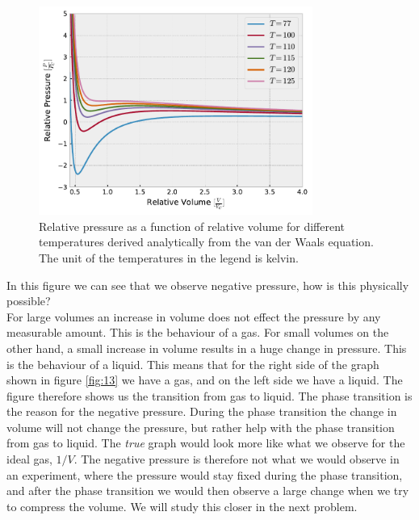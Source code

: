 \documentclass[a4paper,10pt, english]{article}
\begin{document}
\begin{figure}[h!]
  \centering
    \includegraphics[width=0.8\textwidth]{../figures/equation_of_state.pdf}
    \caption{Relative pressure as a function of relative volume for different temperatures derived analytically from the van der Waals equation. The unit of the temperatures in the legend is kelvin.}
    \label{fig:13}
\end{figure}
In this figure we can see that we observe negative pressure, how is this physically possible? \\For large volumes an increase in volume does not effect the pressure by any measurable amount. This is the behaviour of a gas. For small volumes on the other hand, a small increase in volume results in a huge change in pressure. This is the behaviour of a liquid. This means that for the right side of the graph shown in figure \vref{fig:13} we have a gas, and on the left side we have a liquid. The figure therefore shows us the transition from gas to liquid. The phase transition is the reason for the negative pressure. During the phase transition the change in volume will not change the pressure, but rather help with the phase transition from gas to liquid. The \textit{true} graph would look more like what we observe for the ideal gas, $1/V$. The negative pressure is therefore not what we would observe in an experiment, where the pressure would stay fixed during the phase transition, and after the phase transition we would then observe a large change when we try to compress the volume. We will study this closer in the next problem.
\end{document}
